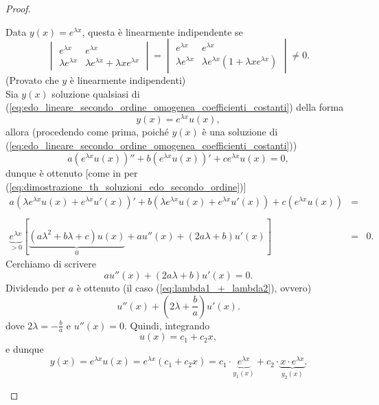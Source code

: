 \begin{proof}
\begin{enumerate}
		\noindent Data $y(x) = e^{\lambda x}$, questa è linearmente indipendente se
		\begin{equation*}
			\begin{vmatrix}
				e^{\lambda x} & e^{\lambda x}\\
				\lambda e^{\lambda x} & \lambda  e^{\lambda  x} + \lambda x e^{\lambda x}
			\end{vmatrix} =  \begin{vmatrix}
				e^{\lambda x} & e^{\lambda  x}\\
				\lambda  e^{\lambda x} & \lambda  e^{\lambda  x} (1 + \lambda x e^{\lambda x})
			\end{vmatrix}\neq 0.
		\end{equation*}
		(Provato che $y$ è linearmente indipendenti)\\
		Sia $y(x)$ soluzione qualsiasi di (\ref{eq:edo_lineare_secondo_ordine_omogenea_coefficienti_costanti}) della forma 
		\begin{equation*}
			y(x) = e^{\lambda x} u(x),
		\end{equation*}
		allora (procedendo come prima, poiché $y(x)$ è una soluzione di (\ref{eq:edo_lineare_secondo_ordine_omogenea_coefficienti_costanti}))
		\begin{equation*}
			a(e^{\lambda x}u(x))'' + b(e^{\lambda x} u(x))' + c e^{\lambda x} u(x) =0,
		\end{equation*}
		dunque è ottenuto [come in per (\ref{eq:dimostrazione_th_soluzioni_edo_secondo_ordine})]
		\begin{equation*}
			\begin{matrix}
				a(\lambda e^{\lambda x}u(x)+e^{\lambda x}u'(x))' + b(\lambda e^{\lambda x}u(x) + e^{\lambda x}u'(x)) + c(e^{\lambda x}u(x)) &=&\\\\
				\underbrace{e^{\lambda x}}_{>0} [\underbrace{(a\lambda^2+b\lambda +c) u(x)}_{0} + a u''(x)+(2a\lambda + b)u'(x)] &=& 0.
			\end{matrix}
		\end{equation*}
		Cerchiamo di scrivere
		\begin{equation*}
			a u''(x)+(2a\lambda + b)u'(x)=0.
		\end{equation*}
		Dividendo per $a$ è ottenuto (il caso (\ref{eq:lambda1_+_lambda2}), ovvero)
		\begin{equation*}
			u''(x)+(2\lambda + \frac{b}{a})u'(x).
		\end{equation*}
		dove $2\lambda = -\frac{b}{a}$ e $u''(x)=0$.
		Quindi, integrando
		\begin{equation*}
			u(x) = c_1+c_2 x,
		\end{equation*}
		e dunque
		\begin{equation*}
			y(x) = e^{\lambda x}u(x) = e^{\lambda x} (c_1+c_2x) = c_1\cdot \underbrace{e^{\lambda x}}_{y_1(x)} + c_2\cdot\underbrace{x\cdot e^{\lambda x}}_{y_2(x)}.
		\end{equation*}
	\end{enumerate}
\end{proof}

